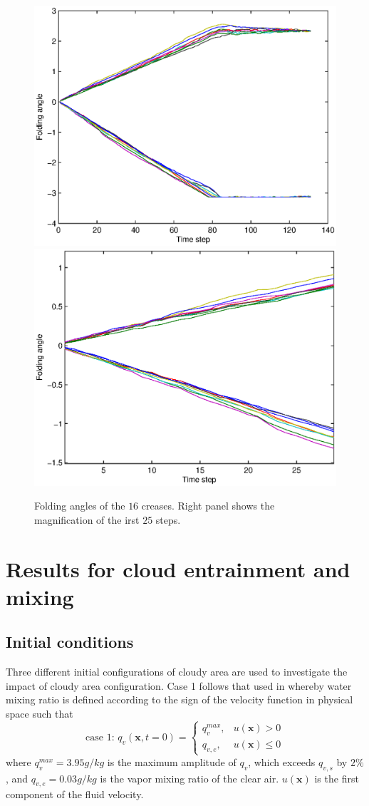 \begin{figure}[!htbp]\centering
\includegraphics[width=0.45\columnwidth]{Figures/folding-angle}
\includegraphics[width=0.45\columnwidth]{Figures/folding-angle-zoom}
\caption{Folding angles of the $16$ creases. Right panel shows the magnification of the irst $25$ steps.}
\label{fig:folding_angles}
\end{figure}

\section{Results for cloud entrainment and mixing}

\subsection{Initial conditions}   

Three different initial configurations of cloudy area are used to investigate the impact of cloudy area configuration. Case 1 follows that used in \cite{And04} whereby water mixing ratio is defined according to the sign of the velocity function in physical space such that
\begin{equation}
\mbox{case 1: } q_v(\mathbf{x},t=0) = 
\left\{\begin{array}{lr}
q_v^{max}, & u(\mathbf{x}) > 0\\
q_{v,e}, & u(\mathbf{x}) \le 0
\end{array}\right.\label{case1}
\end{equation}
where $q_v^{max} = 3.95 g/kg$ is the maximum amplitude of $q_v$, which exceeds $q_{v,s}$ by $2\%$, and $q_{v,e} = 0.03g/kg$ is the vapor mixing ratio of the clear air. $u(\mathbf{x})$ is the first component of the fluid velocity. 

